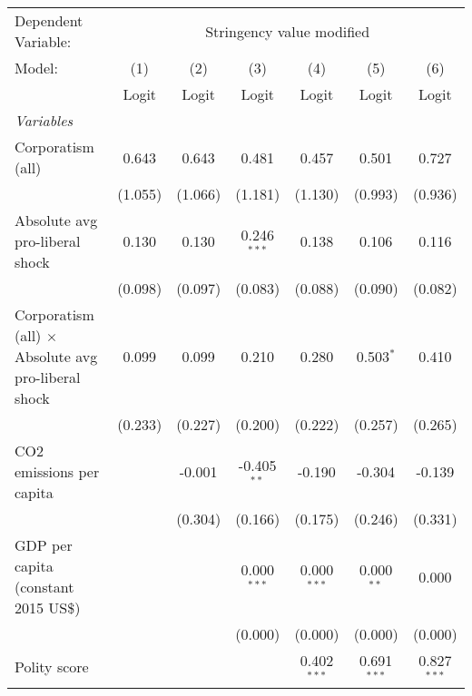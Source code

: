 
\begingroup
\centering
\begin{tabular}{lcccccc}
   \toprule
   Dependent Variable: & \multicolumn{6}{c}{Stringency value modified}\\
   Model:                                                     & (1)     & (2)     & (3)           & (4)           & (5)           & (6)\\  
                                                              &  Logit  & Logit   & Logit         & Logit         & Logit         & Logit\\  
   \midrule
   \emph{Variables}\\
   Corporatism (all)                                          & 0.643   & 0.643   & 0.481         & 0.457         & 0.501         & 0.727\\   
                                                              & (1.055) & (1.066) & (1.181)       & (1.130)       & (0.993)       & (0.936)\\   
   Absolute avg pro-liberal shock                             & 0.130   & 0.130   & 0.246$^{***}$ & 0.138         & 0.106         & 0.116\\   
                                                              & (0.098) & (0.097) & (0.083)       & (0.088)       & (0.090)       & (0.082)\\   
   Corporatism (all) $\times$ Absolute avg pro-liberal shock  & 0.099   & 0.099   & 0.210         & 0.280         & 0.503$^{*}$   & 0.410\\   
                                                              & (0.233) & (0.227) & (0.200)       & (0.222)       & (0.257)       & (0.265)\\   
   CO2 emissions per capita                                   &         & -0.001  & -0.405$^{**}$ & -0.190        & -0.304        & -0.139\\   
                                                              &         & (0.304) & (0.166)       & (0.175)       & (0.246)       & (0.331)\\   
   GDP per capita (constant 2015 US\$)                        &         &         & 0.000$^{***}$ & 0.000$^{***}$ & 0.000$^{**}$  & 0.000\\   
                                                              &         &         & (0.000)       & (0.000)       & (0.000)       & (0.000)\\   
   Polity score                                               &         &         &               & 0.402$^{***}$ & 0.691$^{***}$ & 0.827$^{***}$\\   

\end{tabular}
